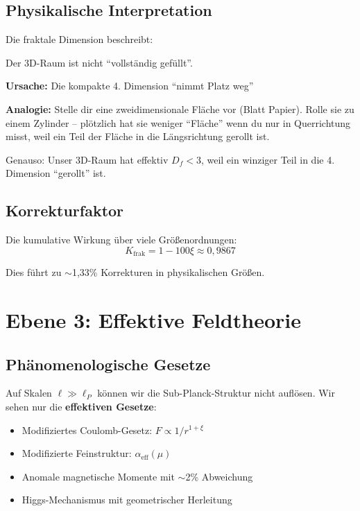 	\subsection{Physikalische Interpretation}
	
	Die fraktale Dimension beschreibt:
	
	\begin{philosophical}
		Der 3D-Raum ist nicht \enquote{vollständig gefüllt}.
		
		\vspace{0.3cm}
		
		\textbf{Ursache:} Die kompakte 4. Dimension \enquote{nimmt Platz weg}
		
		\vspace{0.3cm}
		
		\textbf{Analogie:}
		Stelle dir eine zweidimensionale Fläche vor (Blatt Papier). Rolle sie zu einem Zylinder -- plötzlich hat sie weniger \enquote{Fläche} wenn du nur in Querrichtung misst, weil ein Teil der Fläche in die Längsrichtung gerollt ist.
		
		Genauso: Unser 3D-Raum hat effektiv $D_f < 3$, weil ein winziger Teil in die 4. Dimension \enquote{gerollt} ist.
	\end{philosophical}
	
	\subsection{Korrekturfaktor}
	
	Die kumulative Wirkung über viele Größenordnungen:
	\begin{equation}
		K_{\text{frak}} = 1 - 100\xi \approx 0{,}9867
	\end{equation}
	
	Dies führt zu $\sim$1{,}33\% Korrekturen in physikalischen Größen.
	
	\section{Ebene 3: Effektive Feldtheorie}
	
	\subsection{Phänomenologische Gesetze}
	
	Auf Skalen $\ell \gg \ell_P$ können wir die Sub-Planck-Struktur nicht auflösen. Wir sehen nur die \textbf{effektiven Gesetze}:
	
	\begin{itemize}
		\item Modifiziertes Coulomb-Gesetz: $F \propto 1/r^{1+\xi}$
		\item Modifizierte Feinstruktur: $\alpha_{\text{eff}}(\mu)$
		\item Anomale magnetische Momente mit $\sim$2\% Abweichung
		\item Higgs-Mechanismus mit geometrischer Herleitung
	\end{itemize}
	
